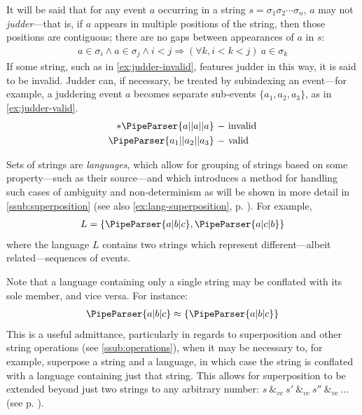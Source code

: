 \documentclass[a4paper,12pt,leqno]{article}
\newcommand{\vph}[1]{\vphantom{#1}}
\newcommand{\ebox}[1]{\fbox{$\vph{'(),}#1$}}
\newcommand{\spvc}{~\&_{v\!c}~}
\newcommand{\EventString}[1]{%
	\renewcommand*{\do}[1]{\ebox{##1}}%
	\PipeParser{#1}%
}
\begin{document}
It will be said that for any event $a$ occurring in a string $s = \sigma_1\sigma_2\cdots\sigma_n$, $a$ may not \textit{judder}---that is, if $a$ appears in multiple positions of the string, then those positions are contiguous; there are no gaps between appearances of $a$ in $s$:
\begin{align}\label{impl:contiguous-events}
	a \in \sigma_i \wedge a \in \sigma_j \wedge i < j \Longrightarrow (\forall k, i < k < j)~ a \in \sigma_k
\end{align}
If some string, such as in \cref{ex:judder-invalid}, features judder in this way, it is said to be invalid. Judder can, if necessary, be treated by subindexing an event---for example, a juddering event $a$ becomes separate sub-events $\{a_1, a_2, a_3\}$, as in \cref{ex:judder-valid}.
\begin{subequations}
	\begin{align}
		* \EventString{a|{}|a|{}|a}\label{ex:judder-invalid} ~-~& \text{invalid}\\
		\EventString{a_1|{}|a_2|{}|a_3}\label{ex:judder-valid} ~-~& \text{valid}
	\end{align}
\end{subequations}

Sets of strings are \textit{languages}, which allow for grouping of strings based on some property---such as their source---and which introduces a method for handling such cases of ambiguity and non-determinism as will be shown in more detail in \cref{ssub:superposition} (see also \cref{ex:lang-superposition}, p. \pageref{ex:lang-superposition}). For example,
\begin{align}
	L = \{\EventString{a|b|c}, \EventString{a|c|b}\}
\end{align}
where the language $L$ contains two strings which represent different---albeit related---sequences of events.

Note that a language containing only a single string may be conflated with its sole member, and vice versa. For instance:
\begin{align}
	\EventString{a|b|c} \approx \{\EventString{a|b|c}\}
\end{align}
This is a useful admittance, particularly in regards to superposition and other string operations (see \cref{ssub:operations}), when it may be necessary to, for example, superpose a string and a language, in which case the string is conflated with a language containing just that string. This allows for superposition to be extended beyond just two strings to any arbitrary number: $s \spvc s' \spvc s'' \spvc \ldots$ (see p. \pageref{def:vc-superposition}).\label{pt:conflation}
\end{document}
